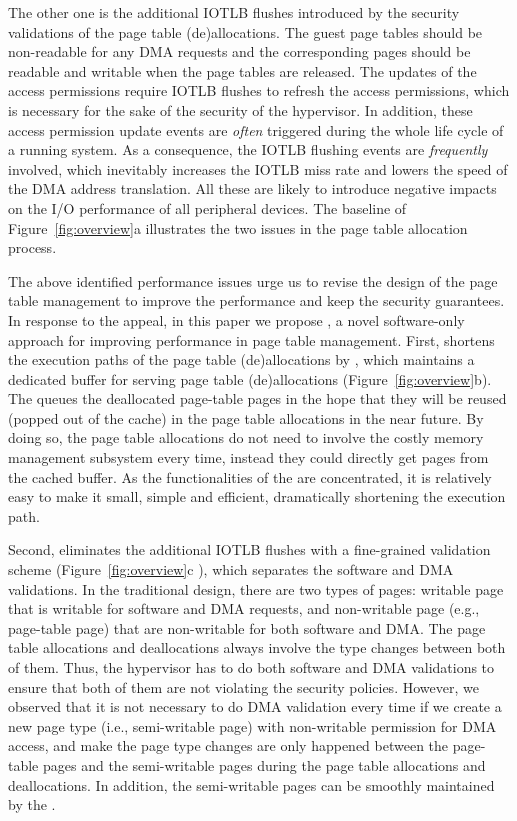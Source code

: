 The other one is the additional IOTLB flushes introduced by the security validations of the page table (de)allocations.
The guest page tables should be non-readable for any DMA requests and the corresponding pages should be readable and writable when the page tables are released.
The updates of the access permissions require IOTLB flushes to refresh the access permissions, which is necessary for the sake of the security of the hypervisor.
In addition, these access permission update events are \emph{often} triggered during the whole life cycle of a running system.
As a consequence, the IOTLB flushing events are \emph{frequently} involved, which inevitably increases the IOTLB miss rate and lowers the speed of the DMA address translation.
All these are likely to introduce negative impacts on the I/O performance of all peripheral devices.
The baseline of Figure~\ref{fig:overview}a illustrates the two issues in the page table allocation process.

The above identified performance issues urge us to revise the design of the page table management to improve the performance and keep the security guarantees.
In response to the appeal, in this paper we propose \name, a novel software-only approach for improving performance in page table management.
First, \name shortens the execution paths of the page table (de)allocations by \cache, which maintains a dedicated buffer for serving page table (de)allocations (Figure~\ref{fig:overview}b).
The \cache queues the deallocated page-table pages in the hope that
they will be reused (popped out of the cache) in the page table allocations in the near future.
By doing so, the page table allocations do not need to involve the costly memory management subsystem every time, instead they could directly get pages from the cached buffer.
As the functionalities of the \cache are concentrated, it is relatively easy to make it small, simple and efficient, dramatically shortening the execution path.

Second, \name eliminates the additional IOTLB flushes with a fine-grained validation scheme (Figure~\ref{fig:overview}c ), which separates the software and DMA validations.
In the traditional design, there are two types of pages: writable page that is writable for software and DMA requests, and non-writable page (e.g., page-table page) that are non-writable for both software and DMA.
The page table allocations and deallocations always involve the type changes between both of them.
Thus, the hypervisor has to do both software and DMA validations to ensure that both of them are not violating the security policies.
However, we observed that it is not necessary to do DMA validation every time if we create a new page type (i.e., semi-writable page) with non-writable permission for DMA access, and make the page type changes are only happened between the page-table pages and the semi-writable pages during the page table allocations and deallocations.
In addition, the semi-writable pages can be smoothly maintained by the \cache.

